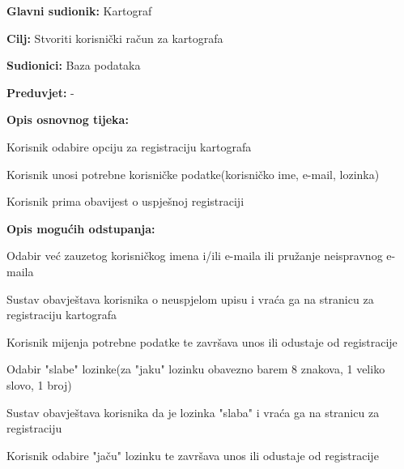 					\noindent {}
					\begin{packed_item}
						
						\item \textbf{Glavni sudionik: }Kartograf
						\item  \textbf{Cilj:} Stvoriti korisnički račun za kartografa
						\item  \textbf{Sudionici:} Baza podataka
						\item  \textbf{Preduvjet:} -
						\item  \textbf{Opis osnovnog tijeka:}
						
						\item[] \begin{packed_enum}
							
							\item Korisnik odabire opciju za registraciju kartografa
							\item Korisnik unosi potrebne korisničke podatke(korisničko ime, e-mail, lozinka)
							\item Korisnik prima obavijest o uspješnoj registraciji
						\end{packed_enum}
						
						\item  \textbf{Opis mogućih odstupanja:}
						
						\item[] \begin{packed_item}
							
							\item[2.a] Odabir već zauzetog korisničkog imena i/ili e-maila ili pružanje neispravnog e-maila
							\item[] \begin{packed_enum}
								
								\item Sustav obavještava korisnika o neuspjelom upisu i vraća ga na stranicu za registraciju kartografa
								\item Korisnik mijenja potrebne podatke te završava unos ili odustaje od registracije
								
							\end{packed_enum}
							\item[2.b] Odabir "slabe" lozinke(za "jaku" lozinku obavezno barem 8 znakova, 1 veliko slovo, 1 broj)
							\item[] \begin{packed_enum}
								\item Sustav obavještava korisnika da je lozinka "slaba" i vraća ga na stranicu za registraciju
								\item Korisnik odabire "jaču" lozinku te završava unos ili odustaje od registracije 
								
							\end{packed_enum}
							
						\end{packed_item}
					\end{packed_item}
					

